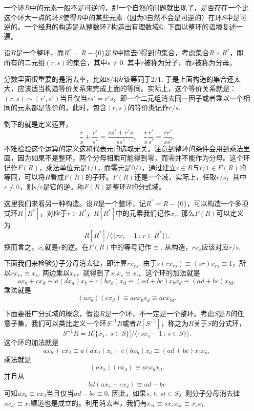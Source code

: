 \para[分式域] 一个环$R$中的元素一般不是可逆的，那一个自然的问题就出现了，是否存在一个比这个环大一点的环$S$使得$R$中的某些元素（因为0自然不会是可逆的）在环$S$中是可逆的。一个经典的构造是从整数环$\mathbb{Z}$构造出有理数域$\mathbb{Q}$. 下面以整环的语境复述一遍。

设$R$是一个整环，而$R^{*}=R-\{0\}$是$R$中除去$0$得到的集合，考虑集合$R\times R^{*}$，即所有的二元组$(r,s)$的集合，其中$s\neq 0$. 其中$r$被称为分子，而$s$被称为分母。

分数里面很重要的是消去率，比如$8/4$应该等同于$2/1$. 于是上面构造的集合还太大，应该适当构造等价关系来完成上面的等同。实际上，这个等价关系就是：$(r,s)\sim (r',s')$当且仅当$rs'=r's$，即一个二元组消去同一因子或者乘以一个相同的元素都是等价的。此时，包含$(r,s)$的等价类记作$r/s$.

剩下的就是定义运算，
\[
	\frac{r}{s}+\frac{r'}{s'}=\frac{rs'+r's}{ss'},\quad \frac{r}{s}\frac{r'}{s'}=\frac{rr'}{ss'}.
\]
不难检验这个运算的定义这和代表元的选取无关。注意到整环的条件会用到乘法里面，因为如果不是整环，两个分母相乘可能得到零，而零并不能作为分母。这个环记作$F(R)$，乘法单位元是$1/1$，而零元是$0/1$，通过建立$r\in R$与$r/1\in F(R)$的等同，可以将$R$看成$F(R)$的子环。$F(R)$还是一个域，实际上，任取$r/s$，其中$r\neq 0$，则$s/r$是它的逆。称$F(R)$是整环$R$的分式域。\endpara

\para 这里我们来看另一种构造。设$R$是一个整环，记$R^*=R-\{0\}$，可以构造一个多项式环$R[R^*]$，对应于$r\in R^*$，$R[R^*]$中的元素我们记作$x_r$. 那么$F(R)$可以定义为
\[
	R[R^*]\big/\bigl\langle\{rx_r-1\,:\, r\in R^*\}\bigr\rangle.
\]
换而言之，$x_r$就是$r$的逆。在$F(R)$中的等号记作$\equiv$. 从构造，$rx_s$应该对应$r/s$.

下面我们来检验分子分母消去律，即计算$rx_{rs}$. 由于$s(rx_{rs})\equiv (sr)x_{rs}\equiv 1$，所以$rx_{rs}\equiv x_s$. 两边乘以$x_r$，就得到了$x_rx_s\equiv x_{rs}$. 这个环的加法就是
\[
	ax_{b}+cx_d\equiv a(dx_d)x_{b}+c(bx_{b})x_d\equiv (ad+bc)x_bx_d \equiv (ad+bc)x_{bd},
\]
乘法就是
\[
	(ax_{b})(cx_d)\equiv acx_bx_d\equiv acx_{bd}.
\]

\para 下面要推广分式域的概念，假设$R$是一个环，不一定是一个整环。考虑$S$是$R$的任意子集，我们可以类比定义一个环$S^{-1}R$或者$R[S^{-1}]$，称之为$R$关于$S$的分式环，
\[
	S^{-1}R=R\bigl[\{x_s\,:\, s\in S\}\bigr]\big/\bigl\langle\{sx_s-1\,:\, s\in S\}\bigr\rangle.
\]
这个环的加法就是
\[
	ax_{b}+cx_d\equiv a(dx_d)x_{b}+c(bx_{b})x_d\equiv (ad+bc)x_bx_d,
\]
乘法就是
\[
	(ax_{b})(cx_d)\equiv acx_bx_d.
\]
并且从
\[
	bd(ax_{b}-cx_d)\equiv ad-bc
\]
可知$ax_{b}\equiv cx_d$当且仅当$ad-bc\equiv 0$. 因此，如果$s$, $t$, $st\in S$，则分子分母消去律$sx_{st}\equiv x_t$顺道也是成立的。利用消去率，我们有$x_{st}\equiv sx_s x_{st}\equiv x_s x_t$.

